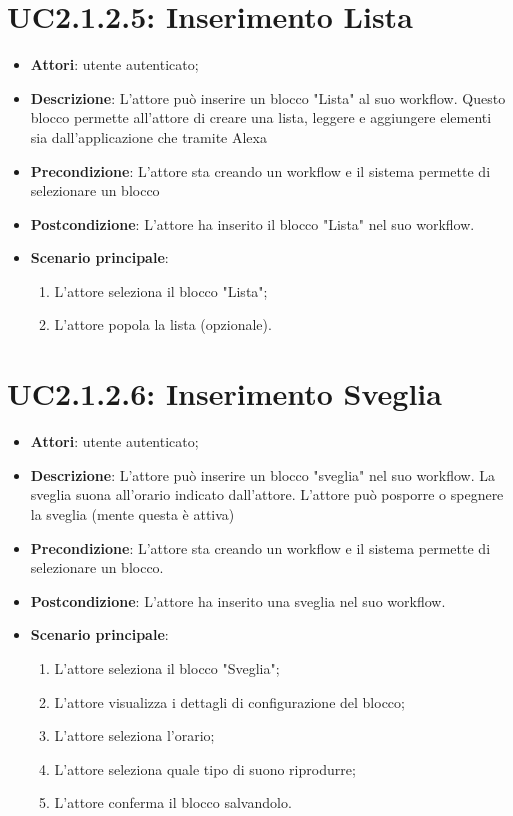 \section{UC2.1.2.5: Inserimento Lista}
\label{UC2.1.2.5}
\begin{itemize}
	\item \textbf{Attori}: utente autenticato;
	\item \textbf{Descrizione}: L'attore può inserire un blocco "Lista" al suo workflow. Questo blocco permette all'attore di creare una lista, leggere e aggiungere elementi sia dall'applicazione che tramite Alexa
	\item \textbf{Precondizione}: L'attore sta creando un workflow e il sistema permette di selezionare un blocco
	\item \textbf{Postcondizione}: L'attore ha inserito il blocco "Lista" nel suo workflow.
	\item \textbf{Scenario principale}:
	\begin{enumerate} \item L'attore seleziona il blocco "Lista";  \item  L'attore popola la lista (opzionale).\end{enumerate}
\end{itemize}

\section{UC2.1.2.6: Inserimento Sveglia}
\label{UC2.1.2.6}
\begin{itemize}
	\item \textbf{Attori}: utente autenticato;
	\item \textbf{Descrizione}: L'attore può inserire un blocco "sveglia" nel suo workflow. La sveglia suona all'orario indicato dall'attore. L'attore può posporre o spegnere la sveglia (mente questa è attiva)
	\item \textbf{Precondizione}: L'attore sta creando un workflow e il sistema permette di selezionare un blocco.
	\item \textbf{Postcondizione}: L'attore ha inserito una sveglia nel suo workflow.
	\item \textbf{Scenario principale}:
	\begin{enumerate} \item L'attore seleziona il blocco "Sveglia";  \item L'attore visualizza i dettagli di configurazione del blocco; \item L'attore seleziona l'orario;  \item  L'attore seleziona quale tipo di suono riprodurre; \item L'attore conferma il blocco salvandolo. \end{enumerate}
\end{itemize}

